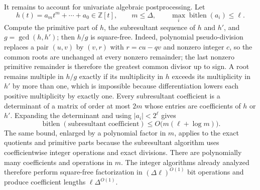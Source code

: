 It remains to account for univariate algebraic postprocessing.  Let
\[
h(t)=a_mt^m+\cdots+a_0\in\mathbb Z[t],
\qquad m\le\Delta,
\qquad \max_i\operatorname{bitlen}(a_i)\le\ell.
\tag{15}
\]
Compute the primitive part of \(h\), the subresultant sequence of \(h\) and \(h'\), and \(g=\gcd(h,h')\); then \(h/g\) is square-free.  Indeed, polynomial pseudo-division replaces a pair \((u,v)\) by \((v,r)\) with \(r=c u-qv\) and nonzero integer \(c\), so the common roots are unchanged at every nonzero remainder; the last nonzero primitive remainder is therefore the greatest common divisor up to sign.  A root remains multiple in \(h/g\) exactly if its multiplicity in \(h\) exceeds its multiplicity in \(h'\) by more than one, which is impossible because differentiation lowers each positive multiplicity by exactly one.  Every subresultant coefficient is a determinant of a matrix of order at most \(2m\) whose entries are coefficients of \(h\) or \(h'\).  Expanding the determinant and using \(|a_i|<2^\ell\) gives
\[
\operatorname{bitlen}(\text{subresultant coefficient})
\le O\bigl(m(\ell+\log m)\bigr).
\tag{16}
\]
The same bound, enlarged by a polynomial factor in \(m\), applies to the exact quotients and primitive parts because the subresultant algorithm uses coefficientwise integer operations and exact divisions.  There are polynomially many coefficients and operations in \(m\).  The integer algorithms already analyzed therefore perform square-free factorization in \((\Delta\ell)^{O(1)}\) bit operations and produce coefficient lengths \(\ell\Delta^{O(1)}\).

